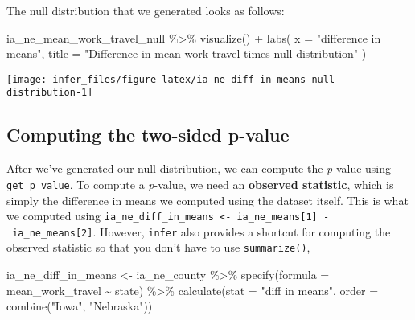 \documentclass[
]{book}
\newenvironment{Shaded}{\begin{snugshade}}{\end{snugshade}}
\newcommand{\AttributeTok}[1]{\textcolor[rgb]{0.77,0.63,0.00}{#1}}
\newcommand{\FunctionTok}[1]{\textcolor[rgb]{0.00,0.00,0.00}{#1}}
\newcommand{\NormalTok}[1]{#1}
\newcommand{\OtherTok}[1]{\textcolor[rgb]{0.56,0.35,0.01}{#1}}
\newcommand{\SpecialCharTok}[1]{\textcolor[rgb]{0.00,0.00,0.00}{#1}}
\newcommand{\StringTok}[1]{\textcolor[rgb]{0.31,0.60,0.02}{#1}}
\begin{document}
The null distribution that we generated looks as follows:

\begin{Shaded}
\begin{Highlighting}[]
\NormalTok{ia\_ne\_mean\_work\_travel\_null }\SpecialCharTok{\%\textgreater{}\%}
  \FunctionTok{visualize}\NormalTok{() }\SpecialCharTok{+}
  \FunctionTok{labs}\NormalTok{(}
    \AttributeTok{x =} \StringTok{"difference in means"}\NormalTok{,}
    \AttributeTok{title =} \StringTok{"Difference in mean work travel times null distribution"}
\NormalTok{  )}
\end{Highlighting}
\end{Shaded}

\begin{center}\texttt{[image: infer\_files/figure-latex/ia-ne-diff-in-means-null-distribution-1]} \end{center}

\hypertarget{computing-the-two-sided-p-value}{%
\subsection{Computing the two-sided p-value}\label{computing-the-two-sided-p-value}}

After we've generated our null distribution, we can compute the \emph{p}-value using \texttt{get\_p\_value}.
To compute a \emph{p}-value, we need an \textbf{observed statistic}, which is simply the difference in means we computed using the dataset itself.
This is what we computed using \texttt{ia\_ne\_diff\_in\_means\ \textless{}-\ ia\_ne\_means{[}1{]}\ -\ ia\_ne\_means{[}2{]}}.
However, \texttt{infer} also provides a shortcut for computing the observed statistic so that you don't have to use \texttt{summarize()},

\begin{Shaded}
\begin{Highlighting}[]
\NormalTok{ia\_ne\_diff\_in\_means }\OtherTok{\textless{}{-}}\NormalTok{ ia\_ne\_county }\SpecialCharTok{\%\textgreater{}\%}
  \FunctionTok{specify}\NormalTok{(}\AttributeTok{formula =}\NormalTok{ mean\_work\_travel }\SpecialCharTok{\textasciitilde{}}\NormalTok{ state) }\SpecialCharTok{\%\textgreater{}\%}
  \FunctionTok{calculate}\NormalTok{(}\AttributeTok{stat =} \StringTok{"diff in means"}\NormalTok{, }\AttributeTok{order =} \FunctionTok{combine}\NormalTok{(}\StringTok{"Iowa"}\NormalTok{, }\StringTok{"Nebraska"}\NormalTok{))}
\end{Highlighting}
\end{Shaded}
\end{document}
